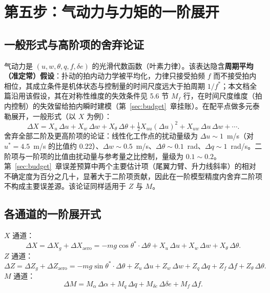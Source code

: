 \documentclass[11pt,a4paper]{ctexart}
\begin{document}
\section{第五步：气动力与力矩的一阶展开}\label{sec:aero}

\subsection{一般形式与高阶项的舍弃论证}

气动力是 $(u,w,\theta,q,f,\delta e)$ 的光滑代数函数（叶素力律）。该表达隐含\textbf{周期平均（准定常）假设}：扑动的拍内动力学被平均化，力律只接受拍频 $f$ 而不接受拍内相位，其成立条件是机体状态与控制量的时间尺度远大于拍周期 $1/f^{*}$；本文档全篇沿用该假设，其在对称性维度的失效条件见 5.6 节 $M_f$ 行，在时间尺度维度（拍内控制）的失效留给拍内瞬时建模（第~\ref{sec:budget}~章挂账）。在配平点做多元泰勒展开，一般形式（以 $X$ 为例）：
\[
\Delta X = X_u\,\Delta u + X_w\,\Delta w + X_\theta\,\Delta\theta
+ \tfrac{1}{2}X_{uu}(\Delta u)^2 + X_{uw}\,\Delta u\,\Delta w + \cdots.
\]
舍弃全部二阶及更高阶项的论证：线性化工作点的扰动量级为 $\Delta u\sim 1$~m/s（对 $u^{*}=4.5$~m/s 的比值约 0.22）、$\Delta w\sim 0.5$~m/s、$\Delta\theta\sim 0.1$~rad、$\Delta q\sim 1$~rad/s。二阶项与一阶项的比值由扰动量与参考量之比控制，量级为 $0.1\sim 0.2$。第~\ref{sec:budget}~章误差预算中两个主要估计项（尾翼力臂、升力线斜率）的相对不确定度为百分之几十，显著大于二阶项贡献，因此在一阶模型精度内舍弃二阶项不构成主要误差源。该论证同样适用于 $Z$ 与 $M$。

\subsection{各通道的一阶展开式}

$X$ 通道：
\begin{equation}\label{eq:5-1}
\Delta X = \Delta X_g + \Delta X_{\mathrm{aero}}
= -m g\cos\theta^{*}\cdot\Delta\theta + X_u\,\Delta u + X_w\,\Delta w + X_\theta\,\Delta\theta.
\tag{(5-1)}
\end{equation}
$Z$ 通道：
\begin{equation}\label{eq:5-2}
\Delta Z = \Delta Z_g + \Delta Z_{\mathrm{aero}}
= -m g\sin\theta^{*}\cdot\Delta\theta + Z_u\,\Delta u + Z_w\,\Delta w + Z_q\,\Delta q + Z_f\,\Delta f + Z_\theta\,\Delta\theta.
\tag{(5-2)}
\end{equation}
$M$ 通道：
\begin{equation}\label{eq:5-3}
\Delta M = M_\alpha\,\Delta\alpha + M_q\,\Delta q + M_{\delta e}\,\Delta\delta e + M_f\,\Delta f.
\tag{(5-3)}
\end{equation}
\end{document}
